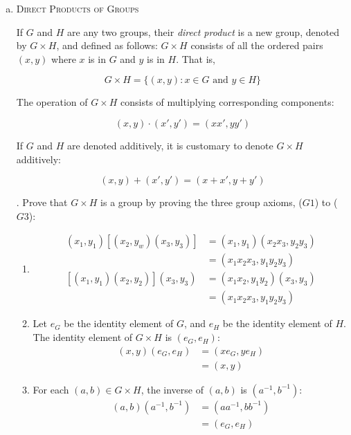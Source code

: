 \documentclass[twoside]{amsart}
\begin{document}
\begin{enumerate}[A.]
\begin{enumerate}[(a)]
      \item \textsc{Direct Products of Groups}

      \noindent If $G$ and $H$ are any two groups, their
      \emph{direct product} is a new group, denoted by $G \times H$,
      and defined as follows: $G \times H$ consists of all the ordered
      pairs $(x,y)$ where $x$ is in $G$ and $y$ is in $H$. That is,

      \[ 
         G \times H = \{(x,y) : x \in G \text{ and } y \in H \} 
      \] 

      The operation of $G \times H$ consists of multiplying corresponding
      components:

      \[ 
         (x,y)\cdot(x',y') = (xx',yy') 
      \]

      If $G$ and $H$ are denoted additively, it is customary to denote
      $G \times H$ additively:

      $$ (x,y)+(x',y') = (x+x',y+y') $$

      . Prove that $G \times H$ is a group by proving
      the three group axioms, ($G1$) to ($G3$):
      \begin{enumerate}[(G1)]
         \item \begin{align*}
	    (x_1,y_1)[(x_2,y_w)(x_3,y_3)] & = (x_1,y_1)(x_2x_3,y_2y_3) \\
	                                  & = (x_1x_2x_3,y_1y_2y_3) \\
	    [(x_1,y_1)(x_2,y_2)](x_3,y_3) & = (x_1x_2,y_1y_2)(x_3,y_3) \\
	                                  & = (x_1x_2x_3,y_1y_2y_3)
	 \end{align*}

	 \item Let $e_G$ be the identity element of $G$, and $e_H$
	 be the identity element of $H$. The identity element of
	 $G \times H$ is $(e_G,e_H)$:
	 \begin{align*}
	    (x,y)(e_G,e_H) & = (xe_G,ye_H)  \\
	                   & = (x,y)
	 \end{align*}

	 \item For each $(a,b)\in G \times H$, the inverse of $(a,b)$
	 is $(a^{-1},b^{-1})$:
	 \begin{align*}
	    (a,b)(a^{-1},b^{-1}) & = (aa^{-1},bb^{-1}) \\
	                         & = (e_G,e_H)
	 \end{align*}
      \end{enumerate}


\end{enumerate}
\end{enumerate}
\end{document}
